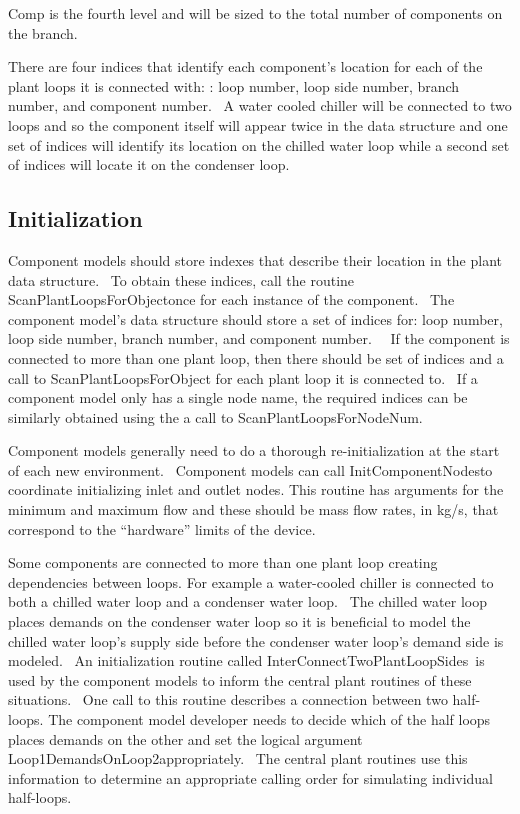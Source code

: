 Comp is the fourth level and will be sized to the total number of components on the branch.

There are four indices that identify each component's location for each of the plant loops it is connected with: : loop number, loop side number, branch number, and component number.~ A water cooled chiller will be connected to two loops and so the component itself will appear twice in the data structure and one set of indices will identify its location on the chilled water loop while a second set of indices will locate it on the condenser loop.~~

\subsection{Initialization}\label{initialization}

Component models should store indexes that describe their location in the plant data structure.~ To obtain these indices, call the routine ScanPlantLoopsForObjectonce for each instance of the component.~ The component model's data structure should store a set of indices for: loop number, loop side number, branch number, and component number.~~ If the component is connected to more than one plant loop, then there should be set of indices and a call to ScanPlantLoopsForObject for each plant loop it is connected to.~ If a component model only has a single node name, the required indices can be similarly obtained using the a call to ScanPlantLoopsForNodeNum.

Component models generally need to do a thorough re-initialization at the start of each new environment.~ Component models can call InitComponentNodesto coordinate initializing inlet and outlet nodes. This routine has arguments for the minimum and maximum flow and these should be mass flow rates, in kg/s, that correspond to the ``hardware'' limits of the device.

Some components are connected to more than one plant loop creating dependencies between loops. For example a water-cooled chiller is connected to both a chilled water loop and a condenser water loop.~ The chilled water loop places demands on the condenser water loop so it is beneficial to model the chilled water loop's supply side before the condenser water loop's demand side is modeled.~ An initialization routine called InterConnectTwoPlantLoopSides~is used by the component models to inform the central plant routines of these situations.~ One call to this routine describes a connection between two half-loops. The component model developer needs to decide which of the half loops places demands on the other and set the logical argument Loop1DemandsOnLoop2appropriately.~ The central plant routines use this information to determine an appropriate calling order for simulating individual half-loops.

